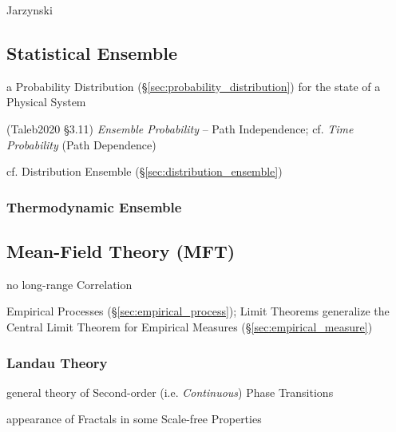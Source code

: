 Jarzynski



\subsection{Statistical Ensemble}\label{sec:statistical_ensemble}

a Probability Distribution (\S\ref{sec:probability_distribution}) for the state
of a Physical System

(Taleb2020 \S 3.11) \emph{Ensemble Probability} -- Path Independence; cf.
\emph{Time Probability} (Path Dependence)

cf. Distribution Ensemble (\S\ref{sec:distribution_ensemble})



\subsubsection{Thermodynamic Ensemble}\label{sec:thermodynamic_ensemble}



\subsection{Mean-Field Theory (MFT)}\label{sec:mft}

no long-range Correlation

\fist Empirical Processes (\S\ref{sec:empirical_process}); Limit Theorems
generalize the Central Limit Theorem for Empirical Measures
(\S\ref{sec:empirical_measure})



\subsubsection{Landau Theory}\label{sec:landau_theory}

general theory of Second-order (i.e. \emph{Continuous}) Phase Transitions

appearance of Fractals in some Scale-free Properties




